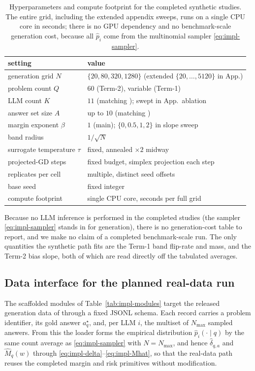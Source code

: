 \documentclass{article} %
\providecommand{\dhat}{\widehat{\delta}}
\providecommand{\phat}{\widehat{p}}
\providecommand{\Mhat}{\widehat{M}}
\begin{document}
\begin{table}[t]
\centering
\small
\begin{tabular}{ll}
\toprule
setting & value \\
\midrule
generation grid $N$ & $\{20,80,320,1280\}$ (extended $\{20,\dots,5120\}$ in App.) \\
problem count $Q$ & $60$ (Term-2), variable (Term-1) \\
LLM count $K$ & $11$ (matching \cite{komiyama2026best}); swept in App.\ ablation \\
answer set size $A$ & up to $10$ (matching \cite{komiyama2026best}) \\
margin exponent $\beta$ & $1$ (main); $\{0,0.5,1,2\}$ in slope sweep \\
band radius & $1/\sqrt N$ \\
surrogate temperature $\tau$ & fixed, annealed $\times 2$ midway \\
projected-GD steps & fixed budget, simplex projection each step \\
replicates per cell & multiple, distinct seed offsets \\
base seed & fixed integer \\
compute footprint & single CPU core, seconds per full grid \\
\bottomrule
\end{tabular}
\caption{Hyperparameters and compute footprint for the completed synthetic
studies.  The entire grid, including the extended appendix sweeps, runs on a
single CPU core in seconds; there is no GPU dependency and no benchmark-scale
generation cost, because all $\phat_i$ come from the multinomial sampler
\eqref{eq:impl-sampler}.}
\label{tab:impl-hparams}
\end{table}

Because no LLM inference is performed in the completed studies (the sampler
\eqref{eq:impl-sampler} stands in for generation), there is no
generation-cost table to report, and we make no claim of a completed
benchmark-scale run.  The only quantities the synthetic path fits are the
Term-1 band flip-rate and mass, and the Term-2 bias slope, both of which
are read directly off the tabulated averages.

\subsection{Data interface for the planned real-data run}
\label{app:impl-data}

The scaffolded modules of Table~\ref{tab:impl-modules} target the released
generation data of \cite{komiyama2026best} through a fixed JSONL schema.  Each
record carries a problem identifier, its gold answer $a_q^\star$, and, per LLM
$i$, the multiset of $N_{\max}$ sampled answers.  From this the loader forms the
empirical distribution $\phat_i(\cdot\mid q)$ by the same count average as
\eqref{eq:impl-sampler} with $N=N_{\max}$, and hence $\dhat_{q,a}$ and
$\Mhat_q(w)$ through \eqref{eq:impl-delta}--\eqref{eq:impl-Mhat}, so that the
real-data path reuses the completed margin and risk primitives without
modification.
\end{document}
